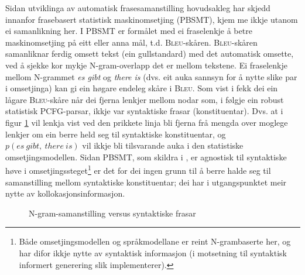 \documentclass[11pt,a4paper,oneside,draft]{report}
\newcommand{\Bleu}{\textsc{Bleu}}
\begin{document}
Sidan utviklinga av automatisk frasesamanstilling hovudsakleg har
skjedd innanfor frasebasert statistisk maskinomsetjing (PBSMT), kjem
me ikkje utanom ei samanlikning her. I PBSMT er formålet med ei
fraselenkje å betre maskinomsetjing på eitt eller anna mål,
t.d. \Bleu-skåren. \Bleu-skåren samanliknar ferdig omsett tekst (ein
gullstandard) med det automatisk omsette, ved å sjekke kor mykje
N-gram-overlapp det er mellom tekstene. Ei fraselenkje mellom
N-grammet \emph{es gibt} og \emph{there is} (dvs. eit auka sannsyn for å nytte
slike par i omsetjinga) kan gi ein høgare endeleg skåre i \Bleu. Som
vist i \citet{koehn2003spb} fekk dei ein lågare \Bleu-skåre når dei
  fjerna lenkjer mellom nodar som, i følgje ein robust
statistisk PCFG-parsar, ikkje var syntaktiske frasar
(konstituentar). Dvs. at i figur \ref{fig:ikkjenode} vil lenkja vist
ved den prikkete linja bli fjerna frå mengda over moglege lenkjer om
ein berre held seg til syntaktiske konstituentar, og
$p(es~gibt,~there~is)$ vil ikkje bli tilsvarande auka i den
statistiske omsetjingsmodellen. Sidan PBSMT, som skildra i
\citet{koehn2003spb}, er agnostisk til syntaktiske høve i
omsetjingssteget\footnote{Både omsetjingsmodellen og språkmodellane er reint
      N-grambaserte her, og har difor ikkje nytte av syntaktisk
      informasjon (i motsetning til syntaktisk informert generering
      slik \citet{riezler2006gmt} implementerer). } er det for dei ingen grunn til å berre halde
seg til samanstilling mellom syntaktiske konstituentar; dei har i
utgangspunktet meir nytte av kollokasjonsinformasjon.

\begin{figure}[htp]
   \centering
   \caption{N-gram-samanstilling versus syntaktiske frasar}
    \label{fig:ikkjenode}
  \end{figure}
\end{document}
